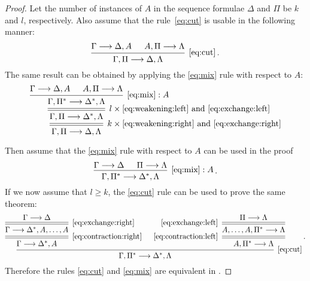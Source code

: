 \documentclass[11pt,a4paper]{article}
\begin{document}
\begin{proof}
    Let the number of instances of \(A\) in the sequence
    formulae \(\Delta\) and \(\Pi\) be \(k\) and \(l\),
    respectively. Also assume that the rule~\eqref{eq:cut}
    is usable in the following manner:
    \begin{equation*}
        \begin{prooftree}
            \hypo{\Gamma\seq\Delta, A}
            \hypo{A, \Pi\seq\Lambda}
            \infer2[\eqref{eq:cut}]{\Gamma,\Pi\seq\Delta,\Lambda}
        \end{prooftree}\,.
    \end{equation*}
    The same result can be obtained by applying the \eqref{eq:mix} rule with respect to \(A\):
    \begin{equation*}
        \begin{prooftree}
            \hypo{\Gamma\seq\Delta, A}
            \hypo{A, \Pi\seq\Lambda}
            \infer2[\(\eqref{eq:mix}:A\)]{\Gamma,\Pi^\ast\seq\Delta^\ast,\Lambda}
            \infer[rule style=double]1[\(l\times\eqref{eq:weakening:left}\) and \eqref{eq:exchange:left}]{
                \Gamma,\Pi\seq\Delta^\ast,\Lambda
            }
            \infer[rule style=double]1[\(k\times\eqref{eq:weakening:right}\) and \eqref{eq:exchange:right}]{
                \Gamma,\Pi\seq\Delta,\Lambda
            }
        \end{prooftree}
    \end{equation*}

    Then assume that the \eqref{eq:mix} rule with respect to \(A\) can be used in the proof
    \begin{equation*}
        \begin{prooftree}
            \hypo{\Gamma\seq\Delta}
            \hypo{\Pi\seq\Lambda}
            \infer2[\(\eqref{eq:mix}:A\)]{\Gamma,\Pi^\ast\seq\Delta^\ast,\Lambda}
        \end{prooftree} \,.
    \end{equation*}
    If we now assume that \(l\geq k\), the \eqref{eq:cut} rule can be used to prove the same theorem:
    \begin{equation*}
        \begin{prooftree}
            \hypo{\Gamma\seq\Delta}
            \infer[rule style=double]1[\eqref{eq:exchange:right}]{\Gamma\seq\Delta^\ast, A,\ldots, A}
            \infer[rule style=double]1[\eqref{eq:contraction:right}]{\Gamma\seq\Delta^\ast, A}
            \hypo{\Pi\seq\Lambda}
            \infer[rule style=double,left label=\eqref{eq:exchange:left}]1{A,\ldots,A,\Pi^\ast\seq\Lambda}
            \infer[rule style=double,left label=\eqref{eq:contraction:left}]1{A,\Pi^\ast\seq\Lambda}
            \infer2[\eqref{eq:cut}]{\Gamma,\Pi^\ast\seq\Delta^\ast,\Lambda}
        \end{prooftree}\,.
    \end{equation*}
    Therefore the rules \eqref{eq:cut} and \eqref{eq:mix} are equivalent in \LK.
\end{proof}
\end{document}
